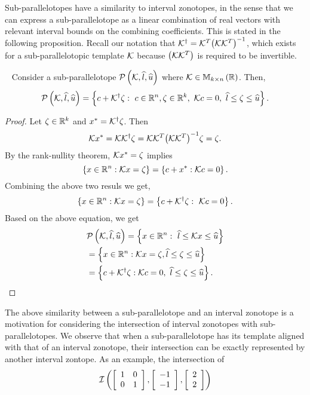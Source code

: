 Sub-parallelotopes have a similarity to interval zonotopes, in the
sense that we can express a sub-parallelotope as a linear combination
of real vectors with relevant interval bounds on the combining
coefficients.  This is stated in the following proposition.  Recall
our notation that
${\mathcal{K}}^\dagger={\mathcal{K}}^T{\left(\mathcal{K}{\mathcal{K}}^T\right)}^{-1}$,
which exists for a sub-parallelotopic template $\mathcal{K}$ because
$\left(\mathcal{K}{\mathcal{K}}^T\right)$ is required to be invertible.
%
\begin{proposition}~\label{lem:ptope-iz-conversion}
  Consider a sub-parallelotope
  $\mathcal{P}\left(\mathcal{K},\widehat{l},\widehat{u}\right)$ where $\mathcal{K}\in\mathbb{M}_{k\times n}\left(\mathbb{R}\right)$.
  Then,
  \[
  \mathcal{P}\left(\mathcal{K},\widehat{l},\widehat{u}\right)=\left\{c+{\mathcal{K}}^\dagger\zeta:~c\in\mathbb{R}^n,\zeta\in\mathbb{R}^k,~\mathcal{K}
  c=0,~\widehat{l}\leq
  \zeta\leq \widehat{u}
  \right\}.
  \]
%
\end{proposition}
%
\begin{proof}
Let $\zeta\in\mathbb{R}^k$ and $x^*={\mathcal{K}}^\dagger\zeta$.  Then
%
\[
\mathcal{K} x^*=\mathcal{K}{\mathcal{K}}^\dagger\zeta = \mathcal{K}\mathcal{K}^T{\left(\mathcal{K}\mathcal{K}^T\right)}^{-1}\zeta=\zeta.
\]
%
By the rank-nullity theorem, $\mathcal{K} x^* = \zeta$ implies
%
\begin{equation}
\left\{x\in\mathbb{R}^n:\mathcal{K} x=\zeta\right\}=\left\{c+x^*:\mathcal{K} c=0\right\}.
\end{equation}
%
Combining the above two resuls we get,
%
\begin{equation}
\left\{x\in\mathbb{R}^n:\mathcal{K} x=\zeta\right\}=\left\{c+{\mathcal{K}}^\dagger\zeta:~\mathcal{K} c=0\right\}.
\end{equation}
%
Based on the above equation, we get
%
\begin{align*}
& \mathcal{P}\left(\mathcal{K},\widehat{l},\widehat{u}\right) = \left\{x\in\mathbb{R}^n:~\widehat{l}\leq \mathcal{K} x\leq\widehat{u}\right\}\nonumber\\
& = \left\{x\in\mathbb{R}^n:\mathcal{K}
  x=\zeta, \widehat{l}\leq \zeta\leq\widehat{u}\right\}\nonumber\\
& = \left\{c+{\mathcal{K}}^\dagger\zeta:\mathcal{K} c=0,~\widehat{l}\leq\zeta\leq\widehat{u}\right\}.~~~\qedhere
\end{align*}
%
\end{proof}
%
The above similarity between a sub-parallelotope and an interval
zonotope is a motivation for considering the intersection of interval
zonotopes with sub-parallelotopes.  We observe that when a
sub-parallelotope has its template aligned with that of an interval
zonotope, their intersection can be exactly represented by another
interval zontope.  As an example, the intersection of
%
\[
\mathit{\operatorname{\mathcal{I}}}\left(\left[\begin{array}{l l}1 & 0 \\ 0 &
      1\end{array}\right],\left[\begin{array}{c}-1\\ -1\end{array}\right],\left[\begin{array}{c}2\\ 2\end{array}\right]\right)
\]
